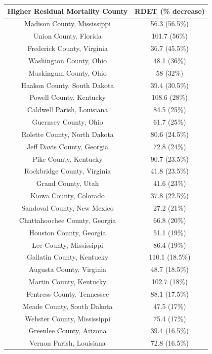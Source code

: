 \begin{table}[ht]
\centering
\begin{tabular}{cc}
  \toprule
Higher Residual Mortality County & RDET (\% decrease) \\ 
  \midrule
Madison County, Mississippi & 56.3 (56.5\%) \\ 
  Union County, Florida & 101.7 (56\%) \\ 
  Frederick County, Virginia & 36.7 (45.5\%) \\ 
  Washington County, Ohio & 48.1 (36\%) \\ 
  Muskingum County, Ohio & 58 (32\%) \\ 
  Haakon County, South Dakota & 39.4 (30.5\%) \\ 
  Powell County, Kentucky & 108.6 (28\%) \\ 
  Caldwell Parish, Louisiana & 84.5 (25\%) \\ 
  Guernsey County, Ohio & 61.7 (25\%) \\ 
  Rolette County, North Dakota & 80.6 (24.5\%) \\ 
  Jeff Davis County, Georgia & 72.8 (24\%) \\ 
  Pike County, Kentucky & 90.7 (23.5\%) \\ 
  Rockbridge County, Virginia & 41.8 (23.5\%) \\ 
  Grand County, Utah & 41.6 (23\%) \\ 
  Kiowa County, Colorado & 37.8 (22.5\%) \\ 
  Sandoval County, New Mexico & 27.2 (21\%) \\ 
  Chattahoochee County, Georgia & 66.8 (20\%) \\ 
  Houston County, Georgia & 51.1 (19\%) \\ 
  Lee County, Mississippi & 86.4 (19\%) \\ 
  Gallatin County, Kentucky & 110.1 (18.5\%) \\ 
  Augusta County, Virginia & 48.7 (18.5\%) \\ 
  Martin County, Kentucky & 102.7 (18\%) \\ 
  Fentress County, Tennessee & 88.1 (17.5\%) \\ 
  Meade County, South Dakota & 47.5 (17\%) \\ 
  Webster County, Mississippi & 75.4 (17\%) \\ 
  Greenlee County, Arizona & 39.4 (16.5\%) \\ 
  Vernon Parish, Louisiana & 72.8 (16.5\%) \\ 

\end{tabular}
\end{table}
